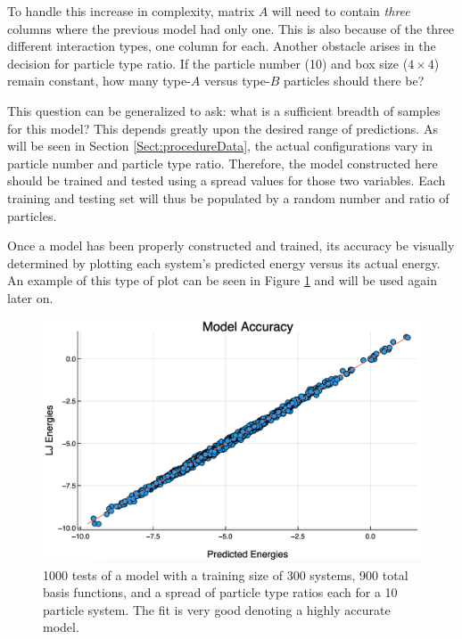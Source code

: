 \par To handle this increase in complexity, matrix $A$ will need to contain \textit{three} columns where the previous model had only one. This is also because of the three different interaction types, one column for each. Another obstacle arises in the decision for particle type ratio. If the particle number (10) and box size ($4\times4$) remain constant, how many type-$A$ versus type-$B$ particles should there be?
\par This question can be generalized to ask: what is a sufficient breadth of samples for this model? This depends greatly upon the desired range of predictions. As will be seen in Section \ref{Sect:procedureData}, the actual configurations vary in particle number and particle type ratio. Therefore, the model constructed here should be trained and tested using a spread values for those two variables. Each training and testing set will thus be populated by a random number and ratio of particles. 
\par Once a model has been properly constructed and trained, its accuracy be visually determined by plotting each system's predicted energy versus its actual energy. An example of this type of plot can be seen in Figure \ref{fig:diatomicAccuracy} and will be used again later on.

\begin{figure}[h]
\includegraphics[scale = 0.3]{Figures/diatomicAccuracy}
\caption{1000 tests of a model with a training size of 300 systems, 900 total basis functions, and a spread of particle type ratios each for a 10 particle system. The fit is very good denoting a highly accurate model.
\label{fig:diatomicAccuracy}}
\end{figure}